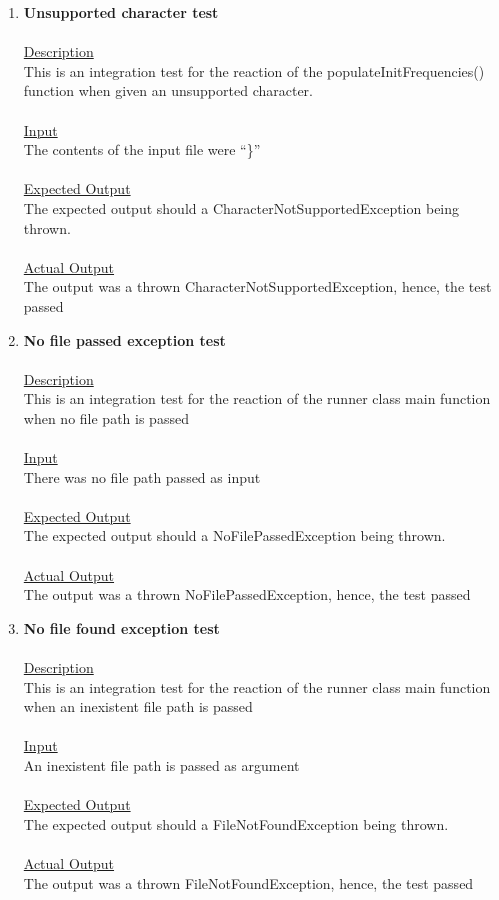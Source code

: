 \documentclass{article}
\newcommand{\quotes}[1]{``#1''}
\begin{document}
\begin{enumerate}
					
					\item \textbf{Unsupported character test}\\\\
		\underline{Description}\\
		\indent This is an integration test for the reaction of the populateInitFrequencies() function when given an unsupported character.\\\\
		\underline{Input}\\
		\indent The contents of the input file were \quotes{\}}\\	\\
		\underline{Expected Output}\\
		\indent The expected output should a CharacterNotSupportedException being thrown.\\\\
		\underline{Actual Output}\\
		The output was a thrown CharacterNotSupportedException, hence, the test passed
		
							\item \textbf{No file passed exception test}\\\\
		\underline{Description}\\
		\indent This is an integration test for the reaction of the runner class main function when no file path is passed\\\\
		\underline{Input}\\
		\indent There was no file path passed as input\\	\\
		\underline{Expected Output}\\
		\indent The expected output should a NoFilePassedException being thrown.\\\\
		\underline{Actual Output}\\
		The output was a thrown NoFilePassedException, hence, the test passed
		
		\item \textbf{No file found exception test}\\\\
		\underline{Description}\\
		\indent This is an integration test for the reaction of the runner class main function when an inexistent file path is passed\\\\
		\underline{Input}\\
		\indent An inexistent file path is passed as argument\\	\\
		\underline{Expected Output}\\
		\indent The expected output should a FileNotFoundException being thrown.\\\\
		\underline{Actual Output}\\
		The output was a thrown FileNotFoundException, hence, the test passed
					
					\end{enumerate}
\end{document}
